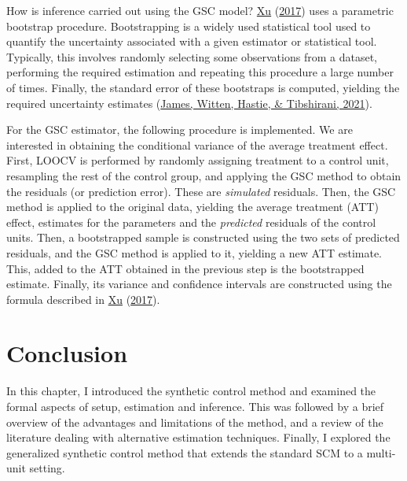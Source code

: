\documentclass[12pt,nobind, a4paper]{reedthesis}
\begin{document}
 How is inference carried out using the GSC model? \protect\hyperlink{ref-xu_generalized_2017}{Xu} (\protect\hyperlink{ref-xu_generalized_2017}{2017}) uses a parametric bootstrap procedure. Bootstrapping is a widely used statistical tool used to quantify the uncertainty associated with a given estimator or statistical tool. Typically, this involves randomly selecting some observations from a dataset, performing the required estimation and repeating this procedure a large number of times. Finally, the standard error of these bootstraps is computed, yielding the required uncertainty estimates (\protect\hyperlink{ref-james_introduction_2021}{James, Witten, Hastie, \& Tibshirani, 2021}).
 \linebreak

 For the GSC estimator, the following procedure is implemented. We are interested in obtaining the conditional variance of the average treatment effect. First, LOOCV is performed by randomly assigning treatment to a control unit, resampling the rest of the control group, and applying the GSC method to obtain the residuals (or prediction error). These are \textit{simulated} residuals. Then, the GSC method is applied to the original data, yielding the average treatment (ATT) effect, estimates for the parameters and the \textit{predicted} residuals of the control units. Then, a bootstrapped sample is constructed using the two sets of predicted residuals, and the GSC method is applied to it, yielding a new ATT estimate. This, added to the ATT obtained in the previous step is the bootstrapped estimate. Finally, its variance and confidence intervals are constructed using the formula described in \protect\hyperlink{ref-xu_generalized_2017}{Xu} (\protect\hyperlink{ref-xu_generalized_2017}{2017}).

 \hypertarget{conc}{%
 \section{Conclusion}\label{conc}}

 In this chapter, I introduced the synthetic control method and examined the formal aspects of setup, estimation and inference. This was followed by a brief overview of the advantages and limitations of the method, and a review of the literature dealing with alternative estimation techniques. Finally, I explored the generalized synthetic control method that extends the standard SCM to a multi-unit setting.
 \linebreak
\end{document}
